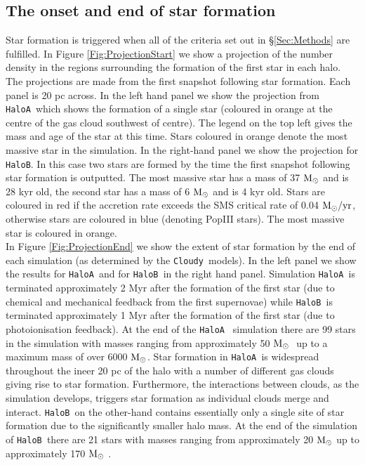 \documentclass[graphics, twocolumn, usenatbib]{mn2e}
\newcommand{\cloudy}{\texttt{Cloudy~}}
\newcommand{\msolar} {$\rm{M_{\odot}}~$}
\newcommand{\msolarc} {$\rm{M_{\odot}}$}
\newcommand{\msolaryrc} {$\rm{M_{\odot}/yr}$}
\newcommand{\ha} {\texttt{HaloA~}}
\newcommand{\hb} {\texttt{HaloB~}}
\newcommand{\hbc} {\texttt{HaloB}}
\begin{document}
\subsection{The onset and end of star formation}
Star formation is triggered when all of the criteria set out in \S \ref{Sec:Methods} are
fulfilled. In Figure \ref{Fig:ProjectionStart} we show a projection of the number density in the
regions surrounding the formation of the first star in each halo. The projections are made from the
first snapshot following star formation. Each panel is 20 pc across. In the left hand panel we
show the projection from \ha which shows the formation of a single star (coloured in orange
at the centre of the gas cloud southwest of centre). The legend on the top left gives the mass and
age of the star at this time. Stars coloured in orange denote the most massive star in the simulation.
In the right-hand panel we show the projection for \hbc. In this case two stars are formed by the time the first
snapshot following star formation is outputted. The most massive star has a mass of 37 \msolar and is 28 kyr old,
the second star has a mass of 6 \msolar and is 4 kyr old. Stars are coloured in red if the
accretion rate exceeds the SMS critical rate of 0.04 \msolaryrc, otherwise 
stars are coloured in blue (denoting PopIII stars). The most massive star is
coloured in orange. \\
\indent In Figure \ref{Fig:ProjectionEnd} we show the extent of star formation by the end of each
simulation (as determined by the \cloudy models). In the left panel we show the results for \ha and
for \hb in the right hand panel. Simulation \ha is terminated approximately 2 Myr after the formation of the first
star (due to chemical and mechanical feedback from the first supernovae) while \hb is terminated approximately 1 Myr after the formation of the first star (due to photoionisation feedback). At the end of the \ha
simulation there are 99 stars in the simulation with masses ranging from approximately 50 \msolar
up to a maximum mass of over 6000 \msolarc.  Star formation in \ha is widespread throughout the
ineer 20 pc of the halo with a number of different gas clouds giving rise to star formation. Furthermore, the interactions between clouds, as the simulation develops, triggers star formation as individual clouds
merge and interact. \hb on the other-hand contains essentially only a single site of star formation
due to the significantly smaller halo mass. At the end of the simulation of \hb there are 21 stars
with masses ranging from approximately 20 \msolar up to approximately 170 \msolar.\\
\end{document}
